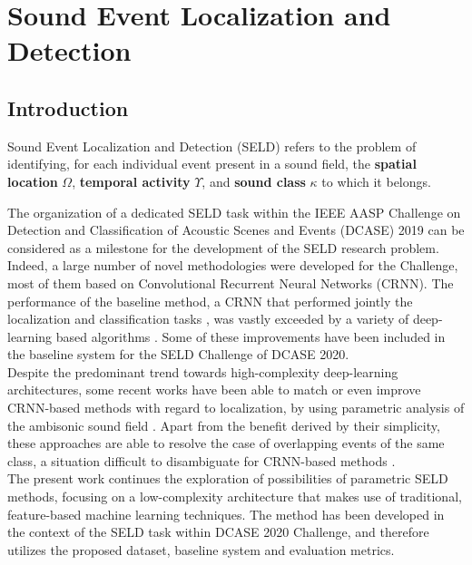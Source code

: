 \chapter{Sound Event Localization and Detection}
\label{chap:seld2019}


\section{Introduction}
\label{sec:intro}
%


Sound Event Localization and Detection (SELD) refers to the problem of identifying, for each individual event present in a sound field, the \textbf{spatial location} $\Omega$, \textbf{temporal activity} $\Upsilon$, and \textbf{sound class} $\kappa$ to which it belongs. 

The organization of a dedicated SELD task within the IEEE AASP Challenge on Detection and Classification of Acoustic Scenes and Events (DCASE) 2019 can be considered as a milestone for the development of the SELD research problem. 
Indeed, a large number of novel methodologies were developed for the Challenge, most of them based on Convolutional Recurrent Neural Networks (CRNN). The performance of the baseline method, a CRNN that performed jointly the localization and classification tasks \cite{Adavanne2018_JSTSP}, was vastly exceeded by a variety of deep-learning based algorithms \cite{kapka2019sound, Cao2019, grondin2019sound}.
Some of these improvements have been included in the baseline system for the SELD Challenge of DCASE 2020. \\

Despite the predominant trend towards high-complexity deep-learning architectures, some recent works have been able to match or even improve CRNN-based methods with regard to localization, by using parametric analysis of the ambisonic sound field \cite{perez2019hybrid, nguyen2020sequence}.  
Apart from the benefit derived by their simplicity, these approaches are able to resolve the case of overlapping events of the same class, a situation difficult to disambiguate for CRNN-based methods \cite{politis2020dataset}.\\


The present work continues the exploration of possibilities of parametric SELD methods, focusing on a low-complexity architecture that makes use of traditional, feature-based machine learning techniques. The method has been developed in the context of the SELD task within DCASE 2020 Challenge, and therefore utilizes the proposed dataset, baseline system and evaluation metrics.\\

